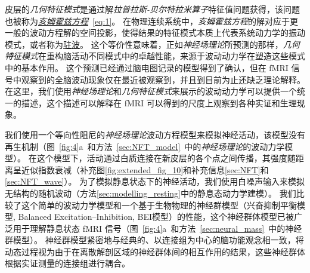 \documentclass[lang=cn,a4paper,newtx]{elegantpaper}
\begin{document}
皮层的\textit{几何特征模式}是通过解\textit{拉普拉斯-贝尔特拉米算子}特征值问题获得，该问题也被称为\href{https://baike.baidu.com/item/%E4%BA%A5%E5%A7%86%E9%9C%8D%E5%85%B9%E6%96%B9%E7%A8%8B}{\textit{亥姆霍兹方程}}~\ref{eq:1}。
在物理连续系统中，\textit{亥姆霍兹方程}的解对应于更一般的波动方程解的空间投影，使得结果的特征模式本质上代表系统动力学的振动模式，或者称为\href{https://baike.baidu.com/item/%E9%A9%BB%E6%B3%A2}{驻波}。
这个等价性意味着，正如\textit{神经场理论}所预测的那样，\textit{几何特征模式}在重构脑活动不同模式中的卓越性能，来源于波动动力学在塑造这些模式中的基本作用。
这个预测已经通过脑电图记录的模型得到了确认，但在 fMRI 信号中观察到的全脑波动现象仅在最近被观察到，并且到目前为止还缺乏理论解释。
在这里，我们使用\textit{神经场理论}和\textit{几何特征模式}来展示的波动动力学可以提供一个统一的描述，这个描述可以解释在 fMRI 可以得到的尺度上观察到各种实证和生理现象。


我们使用一个等向性阻尼的\textit{神经场理论}波动方程模型来模拟神经活动，该模型没有再生机制\cite{robinson1997propagation}（图~\ref{fig:4}a~和方法~\ref{sec:NFT_model}~中的\textit{神经场理论}的波动力学模型）。
在这个模型下，活动通过白质连接在新皮层的各个点之间传播，其强度随距离呈近似指数衰减（补充图\ref{fig:extended_fig_10}和补充信息\ref{sec:NFT}和\ref{sec:NFT_wave}）。
为了模拟静息状态下的神经活动，我们使用白噪声输入来模拟无结构的随机波动（方法\ref{sec:modelling_resting}中的静息态动力学建模）。
我们比较了这个简单的波动力学模型和一个基于生物物理的神经群模型（兴奋抑制平衡模型, Balanced Excitation–Inhibition, BEI模型）的性能，这个神经群体模型已被广泛用于理解静息状态 fMRI 信号\cite{deco2014local}（图~\ref{fig:4}a~和方法~\ref{sec:neural_mass}~中的神经群模型）。
神经群模型紧密地与经典的、以连接组为中心的脑功能观念相一致，将动态过程视为由于在离散解剖区域的神经群体间的相互作用的结果，这些神经群体根据实证测量的连接组进行耦合。
\end{document}
